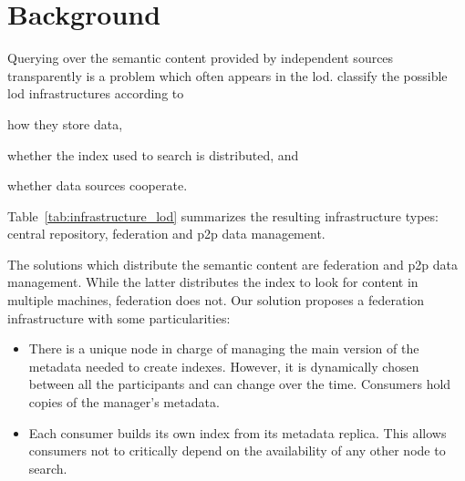 \section{Background}
\label{background}

Querying over the semantic content provided by independent sources transparently is a problem which often appears in the \acf{lod}.
\citet{gorlitz_federated_2011} classify the possible \ac{lod} infrastructures according to
\begin{enumerate*}[label=\itshape(\arabic*\upshape)]
  \item how they store data,
  \item whether the index used to search is distributed, and
  \item whether data sources cooperate.
\end{enumerate*}
Table~\ref{tab:infrastructure_lod} summarizes the resulting infrastructure types: central repository, federation and \ac{p2p} data management.





The solutions which distribute the semantic content are federation and \ac{p2p} data management.
While the latter distributes the index to look for content in multiple machines, federation does not.
Our solution proposes a federation infrastructure with some particularities:
\begin{itemize}
  \item There is a unique node in charge of managing the main version of the metadata needed to create indexes.
	However, it is dynamically chosen between all the participants and can change over the time.
	Consumers hold copies of the manager's metadata.
  \item Each consumer builds its own index from its metadata replica.
	This allows consumers not to critically depend on the availability of any other node to search. %
\end{itemize}



